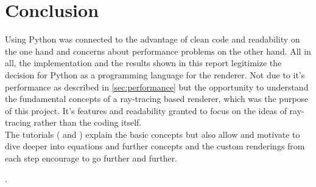 \documentclass[]{article}
\begin{document}
		
	\section{Conclusion}
		Using Python was connected to the advantage of clean code and readability on the one hand and concerns about performance problems on the other hand. All in all, the implementation and the results shown in this report legitimize the decision for Python as a programming language for the renderer. Not due to it's performance as described in \cref{sec:performance} but the opportunity to understand the fundamental concepts of a ray-tracing based renderer, which was the purpose of this project. It's features and readability granted to focus on the ideas of ray-tracing rather than the coding itself.
		\\
		The tutorials (\cite{Shirley2020RTW1} and \cite{Shirley2020RTW2}) explain the basic concepts but also allow and motivate to dive deeper into equations and further concepts and the custom renderings from each step encourage to go further and further.
	
	\vfill
	\printbibliography[heading=bibintoc].
		
\end{document}

